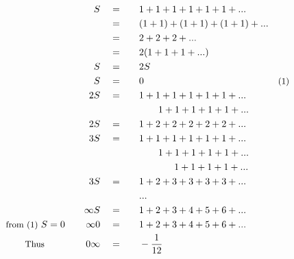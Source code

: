 \begin{alignat*}{5}
&\,&S\quad&=\quad&&1+1+1+1+1+1+...\\
&\,&\,&=&&(1+1)+(1+1)+(1+1)+...\\
&\,&\,&=&&2+2+2+...\\
&\,&\,&=&&2(1+1+1+...)\\
&\,&S\quad&=&&2S\\
&\,&S\quad&=&&0\quad&\small\text{(1)}\\
&\,&2S\quad&=&&1+1+1+1+1+1+...\\
&\,&\,&\,&&\quad~~~1+1+1+1+1+...\\
&\,&2S\quad&=&&1+2+2+2+2+2+...\\
&\,&3S\quad&=&&1+1+1+1+1+1+...\\
&\,&\,&\,&&\quad~~~1+1+1+1+1+...\\
&\,&\,&\,&&\qquad\quad~~1+1+1+1+...\\
&\,&3S\quad&=&&1+2+3+3+3+3+...\\
&\,&\,&\,&&...\\
&\,&\infty S\quad&=\quad&&1+2+3+4+5+6+...\\
&\small\text{from (1) }S=0\normalsize\quad&\infty0\quad&=&&1+2+3+4+5+6+...\\
&\qquad\small\text{Thus}&0\infty\quad&=&&-\frac{1}{12}
\end{alignat*}
